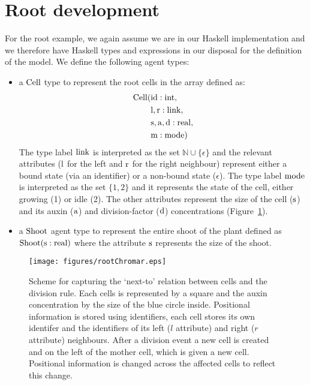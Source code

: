 \section{Root development}
\label{sec:rootDev}
For the root example, we again assume we are in our Haskell implementation and
we therefore have Haskell types and expressions in our disposal for the
definition of the model. We define the following agent types:
\begin{itemize}
\item a $\mathrm{Cell}$ type to represent the root cells in the array defined as:
  \begin{align*}
    \mathrm{Cell}(&\mathrm{id}: \mathrm{int}, \\
              &\mathrm{l, r}: \mathrm{link}, \\
              &\mathrm{s, a, d}: \mathrm{real}, \\
              &\mathrm{m}:\mathrm{mode})
    \end{align*}
    The type label $\mathrm{link}$ is interpreted as the set
    $\mathbb{N} \cup \{\epsilon\}$ and the relevant attributes ($\mathrm{l}$ for the
    left and $\mathrm{r}$ for the right neighbour) represent either a bound state
    (via an identifier) or a non-bound state ($\epsilon$). The type label
    $\mathrm{mode}$ is interpreted as the set $\{ 1, 2 \}$ and it represents the
    state of the cell, either growing (1) or idle (2). The other attributes
    represent the size of the cell ($\mathrm{s}$) and its auxin ($\mathrm{a}$) and
    division-factor ($\mathrm{d}$) concentrations (Figure~\ref{fig:rootDevChromar}).
  \item a $\mathrm{Shoot}$ agent type to represent the entire shoot of the plant
    defined as $\mathrm{Shoot}(\mathrm{s}: \mathrm{real})$ where the attribute $\mathrm{s}$
    represents the size of the shoot.
  \end{itemize}
  
\begin{figure}
    \centering
    \texttt{[image: figures/rootChromar.eps]}
    \caption{Scheme for capturing the `next-to' relation between cells and the
      division rule. Each cells is represented by a square and the auxin
      concentration by the size of the blue circle inside. Positional
      information is stored using identifiers, each cell stores its own
      identifer and the identifiers of its left ($l$ attribute) and right ($r$
      attribute) neighbours. After a division event a new cell is created and on
      the left of the mother cell, which is given a new cell. Positional
      information is changed across the affected cells to reflect this change.}
    \label{fig:rootDevChromar}
  \end{figure}

